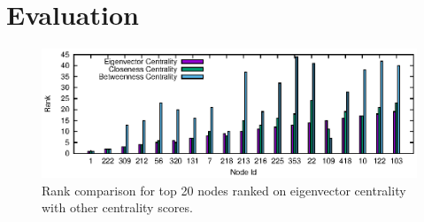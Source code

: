 \section{Evaluation}
\label{eval}

%
%
%
%
%
%
%
%
%
%
%
%
%
%
%
%
%
%
%


\begin{figure}[!ht]
    \centering
    \includegraphics[width=1\textwidth]{figures/social-result_eigen.eps}
    \caption{Rank comparison for top 20 nodes ranked on eigenvector centrality with other centrality scores.}
    \label{fig:social-result-eigen}
\end{figure}

